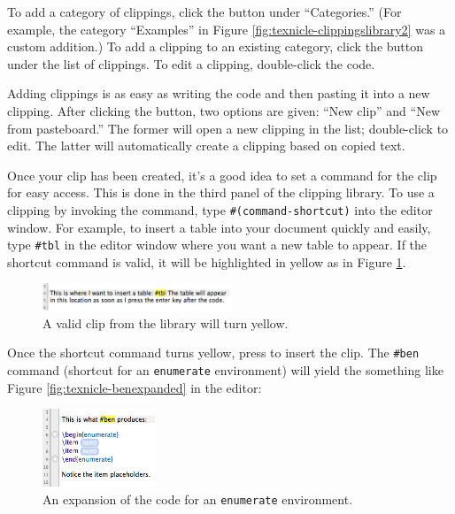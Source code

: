 To add a category of clippings, click the \menu{+} button under ``Categories.'' (For example, the category ``Examples'' in Figure \ref{fig:texnicle-clippingslibrary2} was a custom addition.) To add a clipping to an existing category, click the \menu{+} button under the list of clippings. To edit a clipping, double-click the code.

Adding clippings is as easy as writing the code and then pasting it into a new clipping. After clicking the \menu{+} button, two options are given: ``New clip'' and ``New from pasteboard.'' The former will open a new clipping in the list; double-click to edit. The latter will automatically create a clipping based on copied text.

Once your clip has been created, it's a good idea to set a command for the clip for easy access. This is done in the third panel of the clipping library. To use a clipping by invoking the command, type \verb|#(command-shortcut)| into the editor window. For example, to insert a table into your document quickly and easily, type \verb|#tbl| in the editor window where you want a new table to appear. If the shortcut command is valid, it will be highlighted in yellow as in Figure \ref{fig:texnicle-validclip}.


\begin{figure}[htbp]
\centering
\includegraphics[width=0.5\textwidth]{TeXnicle-Images/texnicle-validclip.png}
\caption{A valid clip from the library will turn yellow.}
\label{fig:texnicle-validclip}
\end{figure}


Once the shortcut command turns yellow, press \keys{\returnkey} to insert the clip. The \verb|#ben| command (shortcut for an \verb|enumerate| environment) will yield the something like Figure \ref{fig:texnicle-benexpanded} in the editor:
\begin{figure}[htbp]
\centering
\includegraphics[width=0.3\textwidth]{TeXnicle-Images/texnicle-expandedben.png}
\caption{An expansion of the code for an \texttt{enumerate} environment.}
\label{fig:texnicle-expandedben}
\end{figure}

